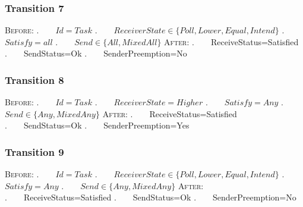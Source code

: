 \subsubsection{Transition 7}


\textsc{Before:}
\newline.~~~~$Id=Task$
\newline.~~~~$ReceiverState \in \{Poll,Lower,Equal,Intend\}$
\newline.~~~~$Satisfy=all$
\newline.~~~~$Send \in \{All,MixedAll\}$
\newline\textsc{After:}
\newline.~~~~ReceiveStatus=Satisfied
\newline.~~~~SendStatus=Ok
\newline.~~~~SenderPreemption=No

\subsubsection{Transition 8}


\textsc{Before:}
\newline.~~~~$Id=Task$
\newline.~~~~$ReceiverState=Higher$
\newline.~~~~$Satisfy=Any$
\newline.~~~~$Send \in \{Any,MixedAny\}$
\newline\textsc{After:}
\newline.~~~~ReceiveStatus=Satisfied
\newline.~~~~SendStatus=Ok
\newline.~~~~SenderPreemption=Yes

\subsubsection{Transition 9}


\textsc{Before:}
\newline.~~~~$Id=Task$
\newline.~~~~$ReceiverState \in \{Poll,Lower,Equal,Intend\}$
\newline.~~~~$Satisfy=Any$
\newline.~~~~$Send \in \{Any,MixedAny\}$
\newline\textsc{After:}
\newline.~~~~ReceiveStatus=Satisfied
\newline.~~~~SendStatus=Ok
\newline.~~~~SenderPreemption=No

